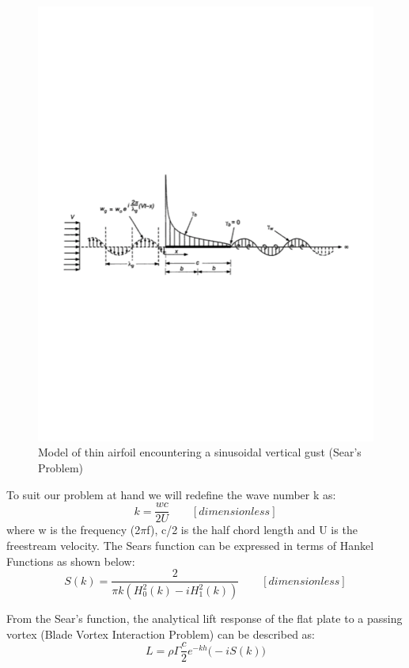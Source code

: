 \documentclass{article}
\begin{document}
\begin{figure}[h]
\centering
\includegraphics[scale = 0.6]{Sears_Problem}
\caption{Model of thin airfoil encountering a sinusoidal vertical gust (Sear's Problem)}
\end{figure}

\noindent To suit our problem at hand we will redefine the wave number k as: 
\begin{equation}
k = \frac{w c}{2 U}  \qquad  [dimensionless]
\end{equation}
where w is the frequency (2$\pi$f), c/2 is the half chord length and U is the freestream velocity. The Sears function can be expressed in terms of Hankel Functions as shown below: 
\begin{equation}
S(k) = \frac{2}{\pi k (H_{0}^2(k) - i H_{1}^2(k))}  \qquad  [dimensionless]
\end{equation}

\newpage
\noindent From the Sear's function, the analytical lift response of the flat plate to a passing vortex (Blade Vortex Interaction Problem) can be described as:
\begin{equation}
L = \rho \Gamma \frac{c}{2} e^{-kh} \Big(-i S(k) \Big)
\end{equation}
\end{document}
